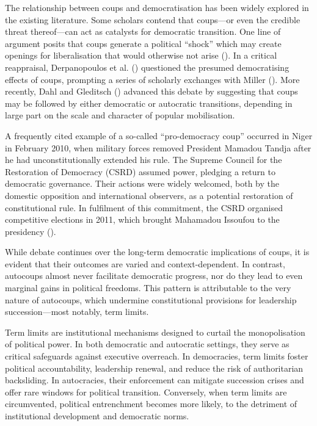 \documentclass[
  12pt,
]{report}
\begin{document}
The relationship between coups and democratisation has been widely
explored in the existing literature. Some scholars contend that
coups---or even the credible threat thereof---can act as catalysts for
democratic transition. One line of argument posits that coups generate a
political ``shock'' which may create openings for liberalisation that
would otherwise not arise (). In a critical reappraisal, Derpanopoulos et al.
() questioned the presumed
democratising effects of coups, prompting a series of scholarly
exchanges with Miller (). More recently,
Dahl and Gleditsch () advanced this debate
by suggesting that coups may be followed by either democratic or
autocratic transitions, depending in large part on the scale and
character of popular mobilisation.

A frequently cited example of a so-called ``pro-democracy coup''
occurred in Niger in February 2010, when military forces removed
President Mamadou Tandja after he had unconstitutionally extended his
rule. The Supreme Council for the Restoration of Democracy (CSRD)
assumed power, pledging a return to democratic governance. Their actions
were widely welcomed, both by the domestic opposition and international
observers, as a potential restoration of constitutional rule. In
fulfilment of this commitment, the CSRD organised competitive elections
in 2011, which brought Mahamadou Issoufou to the presidency
().

While debate continues over the long-term democratic implications of
coups, it is evident that their outcomes are varied and
context-dependent. In contrast, autocoups almost never facilitate
democratic progress, nor do they lead to even marginal gains in
political freedoms. This pattern is attributable to the very nature of
autocoups, which undermine constitutional provisions for leadership
succession---most notably, term limits.

Term limits are institutional mechanisms designed to curtail the
monopolisation of political power. In both democratic and autocratic
settings, they serve as critical safeguards against executive overreach.
In democracies, term limits foster political accountability, leadership
renewal, and reduce the risk of authoritarian backsliding. In
autocracies, their enforcement can mitigate succession crises and offer
rare windows for political transition. Conversely, when term limits are
circumvented, political entrenchment becomes more likely, to the
detriment of institutional development and democratic norms.
\end{document}
